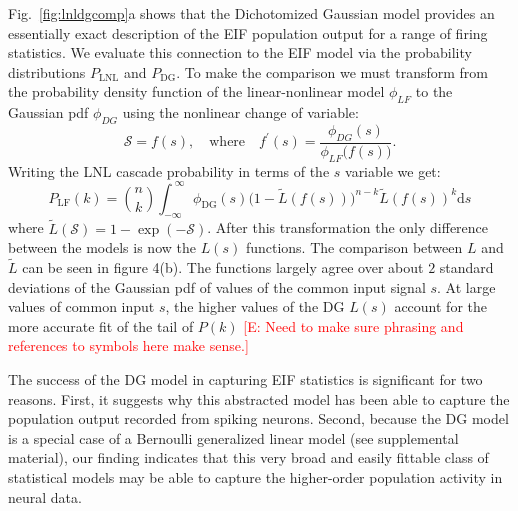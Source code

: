 \documentclass[%
 reprint,
 twocolumn,
 amsmath,amssymb,
 aps,
floatfix,
]{revtex4}
\newcommand{\dd}{\mathrm{d}}
\newcommand{\Ecomment}[1]{\textcolor{red}{[E: #1]}}
\begin{document}
Fig.~\ref{fig:lnldgcomp}a shows that the Dichotomized Gaussian model provides an essentially exact description of the EIF population output for a range of firing statistics.
We evaluate this connection to the EIF model via the probability distributions $P_{\text{LNL}}$ and $P_{\text{DG}}$. To make the comparison we must transform from the probability density function of the linear-nonlinear model $\phi_{LF}$ to the Gaussian pdf $\phi_{DG}$ using the nonlinear change of variable:
\begin{equation}
\mathcal{S} = f(s),\quad\text{where}\quad f^\prime(s) = \frac{\phi_{DG}(s)}{\phi_{LF}\big(f(s)\big)}.
\end{equation}
Writing the LNL cascade probability in terms of the $s$ variable we get:
\begin{equation}
P_{\text{LF}}(k) = \binom{n}{k}\!\!\int_{-\infty}^{~\infty} \phi_{\text{DG}}(s) \big(1-\tilde{L}(f(s))\big)^{n-k} \tilde{L}(f(s))^{k} \dd s
\end{equation}
where $\tilde{L}(\mathcal{S}) = 1-\exp(-\mathcal{S})$. After this transformation the only difference between the models is now the $L(s)$ functions. The comparison between $L$ and $\tilde{L}$ can be seen in figure 4(b). The functions largely agree over about $2$ standard deviations of the Gaussian pdf of values of the common input signal $s$.  At large values of common input $s$, the higher values of the DG $L(s)$ account for the more accurate fit of the tail of $P(k)$ \Ecomment{Need to make sure phrasing and references to symbols here make sense.}  

The success of the DG model in capturing EIF statistics is significant for two reasons.  First, it suggests why this abstracted model has been able to capture the population output recorded from spiking neurons.  Second, because the DG model is a special case of a Bernoulli generalized linear model (see supplemental material), our finding indicates that this very broad and easily fittable class of statistical models may be able to capture the higher-order population activity in neural data.   

\bigskip



\bigskip
\end{document}
